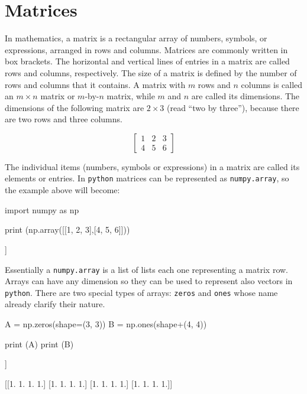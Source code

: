 \chapter{Matrices}
\label{sec:matrices}

In mathematics, a matrix is a rectangular array of numbers, symbols, or expressions, arranged in rows and columns. Matrices are commonly written in box brackets. The horizontal and vertical lines of entries in a matrix are called rows and columns, respectively. The size of a matrix is defined by the number of rows and columns that it contains. A matrix with \(m\) rows and \(n\) columns is called an \(m\times n\) matrix or \(m\)-by-\(n\) matrix, while \(m\) and \(n\) are
called its dimensions. The dimensions of the following matrix are \(2\times 3\) (read ``two by three''), because there are two rows and three columns.

\[\begin{bmatrix}
1 & 2 & 3\\
4 & 5 & 6
\end{bmatrix}\]

The individual items (numbers, symbols or expressions) in a matrix are called its elements or entries. 
In \texttt{python} matrices can be represented as \texttt{numpy.array}, so the example above will become:

\begin{ipython}
import numpy as np

print (np.array([[1, 2, 3],[4, 5, 6]]))
\end{ipython}
\begin{ioutput}
[[1 2 3]
 [4 5 6]]
\end{ioutput}

Essentially a \texttt{numpy.array} is a list of lists each one representing a matrix row. Arrays can have any dimension so they can be used to represent also vectors in \texttt{python}. There are two special types of arrays: \texttt{zeros} and \texttt{ones} whose name already clarify their nature.

\begin{ipython}
A = np.zeros(shape=(3, 3))
B = np.ones(shape+(4, 4))

print (A)
print (B)
\end{ipython}
\begin{ioutput}
[[0. 0. 0.]
 [0. 0. 0.]
 [0. 0. 0.]]

[[1. 1. 1. 1.]
 [1. 1. 1. 1.]
 [1. 1. 1. 1.]
 [1. 1. 1. 1.]]
\end{ioutput}

